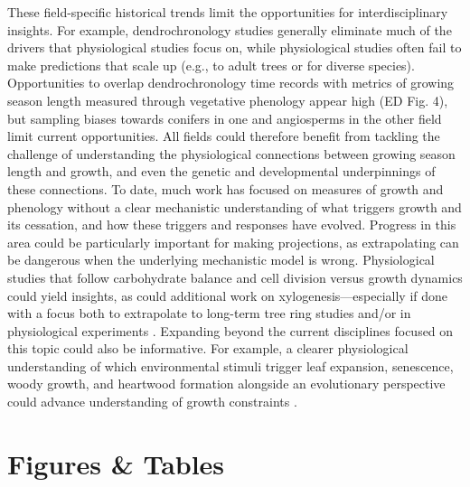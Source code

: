 \documentclass[11pt]{article}
\begin{document}
These field-specific historical trends limit the opportunities for interdisciplinary insights. For example, dendrochronology studies generally eliminate much of the drivers that physiological studies focus on, while physiological studies often fail to make predictions that scale up (e.g., to adult trees or for diverse species). Opportunities to overlap dendrochronology time records with metrics of growing season length measured through vegetative phenology appear high (ED Fig. 4), but sampling biases towards conifers in one and angiosperms in the other field limit current opportunities. All fields could therefore benefit from tackling the challenge of understanding the physiological connections between growing season length and growth, and even the genetic and developmental underpinnings of these connections. To date, much work has focused on measures of growth and phenology without a clear mechanistic understanding of what triggers growth and its cessation, and how these triggers and responses have evolved.  
Progress in this area could be particularly important for making projections, as extrapolating can be dangerous when the underlying mechanistic model is wrong. Physiological studies that follow carbohydrate balance and cell division \citep[see][]{locosselli2017dendrobiochemistry} versus growth dynamics could yield insights, as could additional work on xylogenesis---especially if done with a focus both to extrapolate to long-term tree ring studies and/or in physiological experiments \citep{fang2020physiological,simard2013intra}. Expanding beyond the current disciplines focused on this topic could also be informative. For example, a clearer physiological understanding of which environmental stimuli trigger leaf expansion, senescence, woody growth, and heartwood formation alongside an evolutionary perspective could advance understanding of growth
constraints \citep{baas2011wood,eckert2019makes,ensminger2015tree,juvany2013photo}.


\clearpage
\section*{Figures \& Tables}
\end{document}
